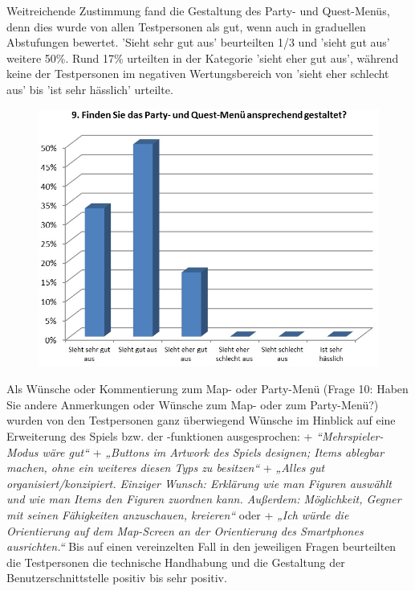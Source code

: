 \documentclass[extern,palatino]{cgBA}
\begin{document}
Weitreichende Zustimmung fand die Gestaltung des Party- und Quest-Menüs, denn dies wurde von allen Testpersonen als gut, wenn auch in graduellen Abstufungen bewertet. 'Sieht sehr gut aus' beurteilten 1/3 und 'sieht gut aus'  weitere 50\%. Rund 17\% urteilten in der Kategorie 'sieht eher gut aus', während keine der Testpersonen im negativen Wertungsbereich von 'sieht eher schlecht aus' bis 'ist sehr hässlich'  urteilte.
\begin{figure}[H]
	\centering
	\includegraphics[width=1\textwidth]{table8.jpg}
\end{figure}
Als Wünsche oder Kommentierung zum Map- oder Party-Menü (Frage 10: Haben Sie andere Anmerkungen oder Wünsche zum Map- oder zum Party-Menü?) wurden von den Testpersonen ganz überwiegend Wünsche im Hinblick auf eine Erweiterung des Spiels bzw. der -funktionen ausgesprochen: + \textit{“Mehrspieler-Modus wäre gut“}  + \textit{„Buttons im Artwork des Spiels designen; Items ablegbar machen, ohne ein weiteres diesen Typs zu besitzen“} + \textit{„Alles gut organisiert/konzipiert. Einziger Wunsch: Erklärung wie man Figuren auswählt und wie man Items den Figuren zuordnen kann. Außerdem: Möglichkeit, Gegner mit seinen Fähigkeiten anzuschauen, kreieren“} oder + \textit{„Ich würde die Orientierung auf dem Map-Screen an der Orientierung des Smartphones ausrichten.“}
Bis auf einen vereinzelten Fall in den jeweiligen Fragen beurteilten die Testpersonen die technische Handhabung und die Gestaltung der Benutzerschnittstelle positiv bis sehr positiv.
\end{document}
